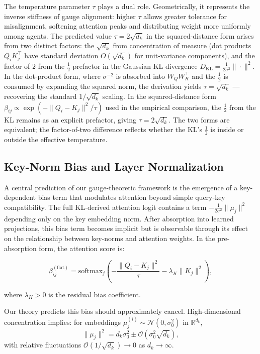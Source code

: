 \documentclass[twoside,11pt]{article}
\begin{document}
The temperature parameter $\tau$ plays a dual role. Geometrically, it represents the inverse stiffness of gauge alignment: higher $\tau$ allows greater tolerance for misalignment, softening attention peaks and distributing weight more uniformly among agents. The predicted value $\tau = 2\sqrt{d_k}$ in the squared-distance form arises from two distinct factors: the $\sqrt{d_k}$ from concentration of measure (dot products $Q_i K_j^\top$ have standard deviation $O(\sqrt{d_k})$ for unit-variance components), and the factor of $2$ from the $\frac{1}{2}$ prefactor in the Gaussian KL divergence $D_{\mathrm{KL}} = \frac{1}{2\sigma^2}\|\cdot\|^2$. In the dot-product form, where $\sigma^{-2}$ is absorbed into $W_Q W_K^\top$ and the $\frac{1}{2}$ is consumed by expanding the squared norm, the derivation yields $\tau = \sqrt{d_k}$ --- recovering the standard $1/\sqrt{d_k}$ scaling. In the squared-distance form $\beta_{ij} \propto \exp(-\|Q_i - K_j\|^2/\tau)$ used in the empirical comparison, the $\frac{1}{2}$ from the KL remains as an explicit prefactor, giving $\tau = 2\sqrt{d_k}$. The two forms are equivalent; the factor-of-two difference reflects whether the KL's $\frac{1}{2}$ is inside or outside the effective temperature.

\subsection{Key-Norm Bias and Layer Normalization}
\label{sec:keynorm_bias_supp}

A central prediction of our gauge-theoretic framework is the emergence of a key-dependent bias term that modulates attention beyond simple query-key compatibility. The full KL-derived attention logit contains a term $-\frac{1}{2\sigma^2}\|\mu_j\|^2$ depending only on the key embedding norm. After absorption into learned projections, this bias term becomes implicit but is observable through its effect on the relationship between key-norms and attention weights. In the pre-absorption form, the attention score is:

\begin{equation}
\beta_{ij}^{(\text{flat})} = \text{softmax}_j\left( -\frac{\|Q_i - K_j\|^2}{\tau} - \lambda_K\|K_j\|^2 \right),
\end{equation}

where $\lambda_K > 0$ is the residual bias coefficient.

Our theory predicts this bias should approximately cancel. High-dimensional concentration implies: for embeddings $\mu_j^{(i)} \sim \mathcal{N}(0, \sigma_0^2)$ in $\mathbb{R}^{d_k}$,
\begin{equation}
\|\mu_j\|^2 = d_k\sigma_0^2 \pm \mathcal{O}(\sigma_0^2\sqrt{d_k}),
\end{equation}
with relative fluctuations $\mathcal{O}(1/\sqrt{d_k}) \to 0$ as $d_k \to \infty$.
\end{document}
